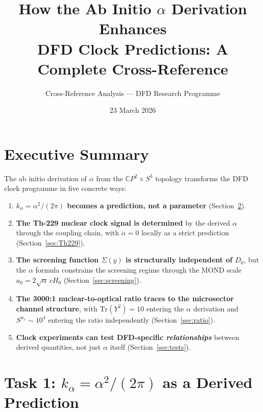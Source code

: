 \documentclass[11pt]{article}
\newcommand{\kalpha}{k_\alpha}
\theoremstyle{definition}
\theoremstyle{remark}
\begin{document}
\title{How the Ab Initio $\alpha$ Derivation Enhances\\
DFD Clock Predictions: A Complete Cross-Reference}

\author{Cross-Reference Analysis --- DFD Research Programme}
\date{23 March 2026}

\maketitle

\tableofcontents
\newpage

\section{Executive Summary}

The ab initio derivation of $\alpha$ from the $\mathbb{C}P^2 \times S^3$
topology transforms the DFD clock programme in five concrete ways:

\begin{enumerate}
\item \textbf{$\kalpha = \alpha^2/(2\pi)$ becomes a prediction, not a parameter}
  (Section~\ref{sec:kalpha}).
\item \textbf{The Th-229 nuclear clock signal is determined} by the derived
  $\alpha$ through the coupling chain, with $\dot\alpha = 0$ locally as a
  strict prediction (Section~\ref{sec:Th229}).
\item \textbf{The screening function $\Sigma(y)$ is structurally independent
  of $D_0$}, but the $\alpha$ formula constrains the screening regime
  through the MOND scale $a_0 = 2\sqrt{\alpha}\,cH_0$
  (Section~\ref{sec:screening}).
\item \textbf{The 3000:1 nuclear-to-optical ratio traces to the microsector
  channel structure}, with $\mathrm{Tr}(Y^2) = 10$ entering the $\alpha$
  derivation and $S^{\alpha_s} \sim 10^4$ entering the ratio independently
  (Section~\ref{sec:ratio}).
\item \textbf{Clock experiments can test DFD-specific \emph{relationships}}
  between derived quantities, not just $\alpha$ itself
  (Section~\ref{sec:tests}).
\end{enumerate}

\section{Task 1: $\kalpha = \alpha^2/(2\pi)$ as a Derived Prediction}
\label{sec:kalpha}
\end{document}
